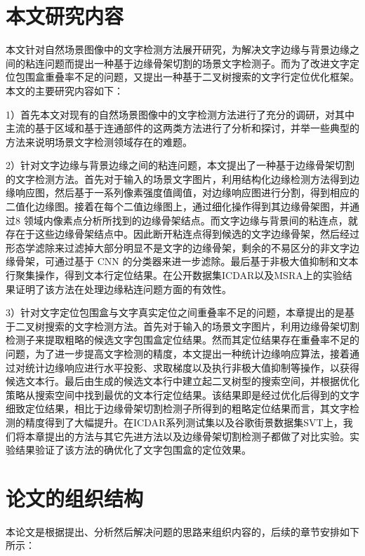     \section{本文研究内容}
    
    本文针对自然场景图像中的文字检测方法展开研究，为解决文字边缘与背景边缘之间的粘连问题而提出一种基于边缘骨架切割的场景文字检测子。而为了改进文字定位包围盒重叠率不足的问题，又提出一种基于二叉树搜索的文字行定位优化框架。本文的主要研究内容如下：
    
    1）首先本文对现有的自然场景图像中的文字检测方法进行了充分的调研，对其中主流的基于区域和基于连通部件的这两类方法进行了分析和探讨，并举一些典型的方法来说明场景文字检测领域存在的难题。
    
    2）针对文字边缘与背景边缘之间的粘连问题，本文提出了一种基于边缘骨架切割的文字检测方法。首先对于输入的场景文字图片，利用结构化边缘检测方法得到边缘响应图，然后基于一系列像素强度值阈值，对边缘响应图进行分割，得到相应的二值化边缘图。接着在每个二值边缘图上，通过细化操作得到其边缘骨架图，并通过8 领域内像素点分析所找到的边缘骨架结点。而文字边缘与背景间的粘连点，就存在于这些边缘骨架结点中。因此断开粘连点得到候选的文字边缘骨架，然后经过形态学滤除来过滤掉大部分明显不是文字的边缘骨架，剩余的不易区分的非文字边缘骨架，可通过基于 CNN 的分类器来进一步滤除。最后基于非极大值抑制和文本行聚集操作，得到文本行定位结果。在公开数据集ICDAR以及MSRA上的实验结果证明了该方法在处理边缘粘连问题方面的有效性。
    
    3）针对文字定位包围盒与文字真实定位之间重叠率不足的问题，本章提出的是基于二叉树搜索的文字检测方法。首先对于输入的场景文字图片，利用边缘骨架切割检测子来提取粗略的候选文字包围盒定位结果。然而其定位结果存在重叠率不足的问题，为了进一步提高文字检测的精度，本文提出一种统计边缘响应算法，接着通过对统计边缘响应进行水平投影、求取梯度以及执行非极大值抑制等操作，以获得候选文本行。最后由生成的候选文本行中建立起二叉树型的搜索空间，并根据优化策略从搜索空间中找到最优的文本行定位结果。该结果即是经过优化后得到的文字细致定位结果，相比于边缘骨架切割检测子所得到的粗略定位结果而言，其文字检测的精度得到了大幅提升。在ICDAR系列测试集以及谷歌街景数据集SVT上，我们将本章提出的方法与其它先进方法以及边缘骨架切割检测子都做了对比实验。实验结果验证了该方法的确优化了文字包围盒的定位效果。

    \section{论文的组织结构}

    本论文是根据提出、分析然后解决问题的思路来组织内容的，后续的章节安排如下所示：
    
